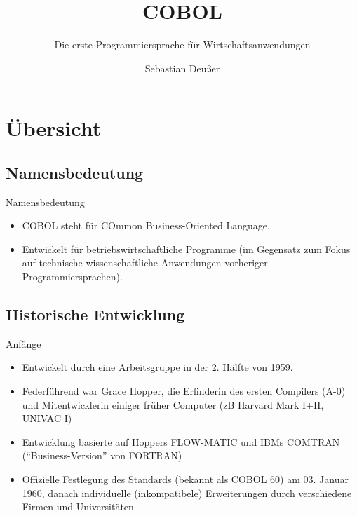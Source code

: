 \documentclass[handout]{beamer}
\title[COBOL-\"Uberblick]   %
{COBOL}
\subtitle
{Die erste Programmiersprache für Wirtschaftsanwendungen} %
\author %
{Sebastian Deußer}
\begin{document}
\begin{frame}
  \titlepage
\end{frame}





\section{Übersicht}

\subsection{Namensbedeutung}

\begin{frame}{Namensbedeutung}
	\begin{itemize}
		\item
			COBOL steht für COmmon Business-Oriented Language.
		\item
			Entwickelt für betriebswirtschaftliche Programme (im Gegensatz zum Fokus auf technische-wissenschaftliche Anwendungen vorheriger Programmiersprachen).
	\end{itemize}
\end{frame}

\subsection{Historische Entwicklung}

\begin{frame}{Anfänge}
	\begin{itemize}
		\item
			Entwickelt durch eine Arbeitsgruppe in der 2. H\"alfte von 1959.
		\item
			Federführend war Grace Hopper, die Erfinderin des ersten Compilers (A-0) und Mitentwicklerin einiger fr\"uher Computer (zB Harvard Mark I+II, UNIVAC I)
		\item
			Entwicklung basierte auf Hoppers FLOW-MATIC und IBMs COMTRAN (``Business-Version'' von FORTRAN)
		\item
		Offizielle Festlegung des Standards (bekannt als COBOL 60) am 03. Januar 1960, danach individuelle (inkompatibele) Erweiterungen durch verschiedene Firmen und Universit\"aten
	\end{itemize}
\end{frame}
\end{document}
